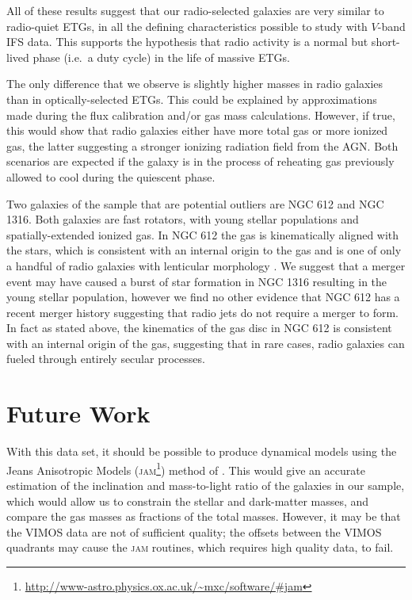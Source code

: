 All of these results suggest that our radio-selected galaxies are very similar to radio-quiet ETGs, in all the defining characteristics possible to study with $V$-band IFS data. This supports the hypothesis that radio activity is a normal but short-lived phase (i.e.\ a duty cycle) in the life of massive ETGs. 

The only difference that we observe is slightly higher  masses in radio galaxies than in optically-selected ETGs. This could be explained by approximations made during the flux calibration and/or gas mass calculations. However, if true, this would show that radio galaxies either have more total gas or more ionized gas, the latter suggesting a stronger ionizing radiation field from the AGN. Both scenarios are expected if the galaxy is in the process of reheating gas previously allowed to cool during the quiescent phase. 

Two galaxies of the sample that are potential outliers are NGC 612 and NGC 1316. Both galaxies are fast rotators, with young stellar populations and spatially-extended ionized gas. In NGC 612 the gas is kinematically aligned with the stars, which is consistent with an internal origin to the gas and is one of only a handful of radio galaxies with lenticular morphology \citep[e.g.][]{Heckman1982, Ledlow1998, Morganti2011}. We suggest that a merger event may have caused a burst of star formation in NGC 1316 resulting in the young stellar population, however we find no other evidence that NGC 612 has a recent merger history suggesting that radio jets do not require a merger to form. In fact as stated above, the kinematics of the gas disc in NGC 612 is consistent with an internal origin of the gas, suggesting that in rare cases, radio galaxies can fueled through entirely secular processes. 


\section{Future Work}
	\label{sec:future}
	With this data set, it should be possible to produce dynamical models using the Jeans Anisotropic Models (\textsc{jam}\footnote{\url{http://www-astro.physics.ox.ac.uk/~mxc/software/\#jam}}) method of \citet{Cappellari2008}. This would give an accurate estimation of the inclination and mass-to-light ratio of the galaxies in our sample, which would allow us to constrain the stellar and dark-matter masses, and compare the gas masses as fractions of the total masses. However, it may be that the VIMOS data are not of sufficient quality; the offsets between the VIMOS quadrants may cause the \textsc{jam} routines, which requires high quality data, to fail. 

